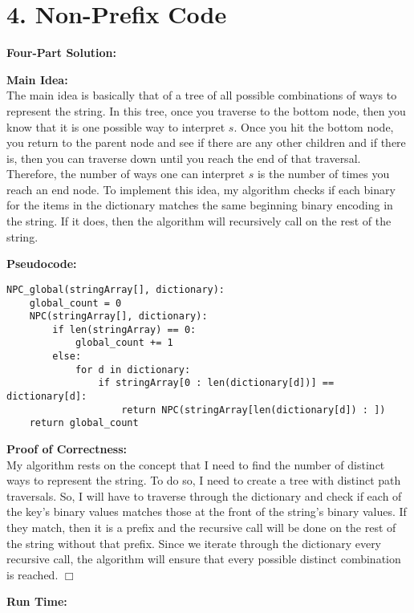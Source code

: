 \documentclass[11pt]{article}
\def\endproofmark{$\Box$}
\newenvironment{FourPartSolution}{\par{\bf Four-Part Solution:}}{\smallskip}
\newenvironment{mainIdea}{\par{\bf Main Idea:}}{\smallskip}
\newenvironment{pseudocode}{\par{\bf Pseudocode:}}{\smallskip}
\newenvironment{proofOfCorrectness}{\par{\bf Proof of Correctness:}}{\endproofmark\smallskip}
\newenvironment{runTime}{\par{\bf Run Time:}}{\smallskip}
\begin{document}
\newpage
\section*{4. Non-Prefix Code}
\begin{FourPartSolution}
\\
\begin{mainIdea}
\\
The main idea is basically that of a tree of all possible combinations of ways to represent the string. In this tree, once you traverse to the bottom node, then you know that it is one possible way to interpret $s$. Once you hit the bottom node, you return to the parent node and see if there are any other children and if there is, then you can traverse down until you reach the end of that traversal. Therefore, the number of ways one can interpret $s$ is the number of times you reach an end node. To implement this idea, my algorithm checks if each binary for the items in the dictionary matches the same beginning binary encoding in the string. If it does, then the algorithm will recursively call on the rest of the string.
\end{mainIdea}
\\
\begin{pseudocode}
\begin{lstlisting}
NPC_global(stringArray[], dictionary):
	global_count = 0
	NPC(stringArray[], dictionary):
		if len(stringArray) == 0:
			global_count += 1
		else:
			for d in dictionary:
				if stringArray[0 : len(dictionary[d])] == dictionary[d]:
					return NPC(stringArray[len(dictionary[d]) : ])
	return global_count
\end{lstlisting}
\end{pseudocode}
\begin{proofOfCorrectness}
\\
My algorithm rests on the concept that I need to find the number of distinct ways to represent the string. To do so, I need to create a tree with distinct path traversals. So, I will have to traverse through the dictionary and check if each of the key's binary values matches those at the front of the string's binary values. If they match, then it is a prefix and the recursive call will be done on the rest of the string without that prefix. Since we iterate through the dictionary every recursive call, the algorithm will ensure that every possible distinct combination is reached.
\end{proofOfCorrectness}
\\
\begin{runTime}

\end{runTime}
\end{FourPartSolution}
\end{document}
